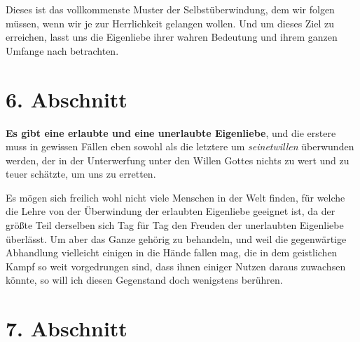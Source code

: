 \medskip

Dieses ist das vollkommenste Muster der
Selbstüberwindung, dem wir
folgen
müssen, wenn wir je zur Herrlichkeit gelangen wollen. Und um dieses Ziel zu
erreichen, lasst uns die Eigenliebe ihrer wahren Bedeutung und ihrem ganzen
Umfange nach betrachten.

\section{6. Abschnitt} \label{kap4_ab6}

\textbf{Es gibt eine erlaubte und eine unerlaubte Eigenliebe}, und die erstere
muss in
gewissen Fällen eben sowohl als die letztere um \textit{seinetwillen}
überwunden
werden, der in der Unterwerfung unter den Willen Gottes nichts zu wert und zu
teuer schätzte, um uns zu erretten.

Es mögen sich freilich wohl nicht viele Menschen in der Welt finden, für welche
die Lehre von der Überwindung der erlaubten Eigenliebe geeignet ist, da der
größte Teil derselben sich Tag für Tag den Freuden der unerlaubten
Eigenliebe überlässt. Um aber das Ganze gehörig zu behandeln, und weil die
gegenwärtige Abhandlung vielleicht einigen in die Hände fallen mag, die in dem
geistlichen Kampf so weit vorgedrungen sind, dass ihnen einiger Nutzen daraus
zuwachsen könnte, so will ich diesen Gegenstand doch wenigstens berühren.

\section{7. Abschnitt} \label{kap4_ab7}

